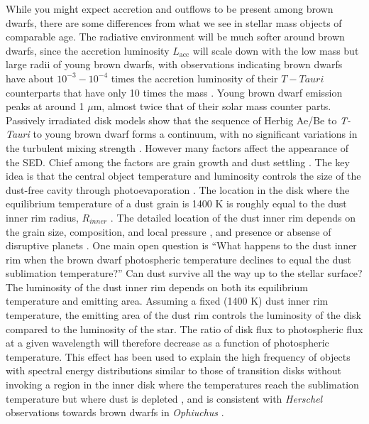 While you might expect accretion and outflows to be present among brown dwarfs, there are some differences from what we see in stellar mass objects of comparable age.  The radiative environment will be much softer around brown dwarfs, since the accretion luminosity $L_{\mathrm{acc}}$ will scale down with the low mass but large radii of young brown dwarfs, with observations indicating brown dwarfs have about $10^{-3}-10^{-4}$ times the accretion luminosity of their $T-Tauri$ counterparts that have only 10 times the mass \citep{2004A&A...424..603N}.  Young brown dwarf emission peaks at around 1 $\mu$m, almost twice that of their solar mass counter parts.  Passively irradiated disk models \citep{2003A&A...398..607D} show that the sequence of Herbig Ae/Be to \emph{T-Tauri} to young brown dwarf forms a continuum, with no significant variations in the turbulent mixing strength \citep{2012A&A...539A...9M}. However many factors affect the appearance of the SED.  Chief among the factors are grain growth and dust settling \citep{2010ApJ...712..925C}.  The key idea is that the central object temperature and luminosity controls the size of the dust-free cavity through photoevaporation \citep{2011ARA&A..49...67W}.  The location in the disk where the equilibrium temperature of a dust grain is 1400 K is roughly equal to the dust inner rim radius, $R_{inner}$ \citep{2001ApJ...560..957D}.  The detailed location of the dust inner rim depends on the grain size, composition, and local pressure \citep{2005A&A...438..899I}, and presence or absense of disruptive planets \citep{2014prpl.conf..667B,2015arXiv150302649P}.  One main open question is ``What happens to the dust inner rim when the brown dwarf photospheric temperature declines to equal the dust sublimation temperature?''  Can dust survive all the way up to the stellar surface?  The luminosity of the dust inner rim depends on both its equilibrium temperature and emitting area.  Assuming a fixed (1400 K) dust inner rim temperature, the emitting area of the dust rim controls the luminosity of the disk compared to the luminosity of the star.  The ratio of disk flux to photospheric flux at a given wavelength will therefore decrease as a function of photospheric temperature.  This effect has been used to explain the high frequency of objects with spectral energy distributions similar to those of transition disks without invoking a region in the inner disk where the temperatures reach the sublimation temperature but where dust is depleted \citep{2009MNRAS.394L.141E}, and is consistent with \emph{Herschel} observations towards brown dwarfs in \emph{Ophiuchus} \citep{2013A&A...559A.126A}.


